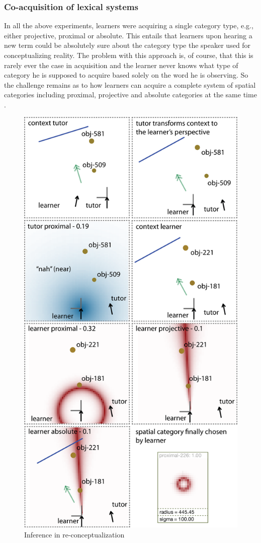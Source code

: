 \subsubsection{Co-acquisition of lexical systems}
In all the above experiments, learners were acquiring a single category type,
e.g., either projective, proximal or absolute. This entails that learners 
upon hearing a new term could be absolutely sure about the 
category type the speaker used for conceptualizing reality.
The problem with this approach is, of course, that this is rarely ever the
case in acquisition and the learner never knows what type of category he is 
supposed to acquire based solely on the word
he is observing. So the challenge remains as to how learners 
can acquire a complete system of spatial categories including proximal, 
projective and absolute categories at the same time . 

\begin{figure}
\begin{center}
\includegraphics[width=0.7\columnwidth]{figs/category-acquisition-absolute+proximal+projective-single-category-acquisition.png}
\end{center}
\caption[Inference in re-conceptualization]{Inference in re-conceptualization}
\label{f:category-acquisition-absolute+proximal+projective-single-acquisition}
\end{figure}

